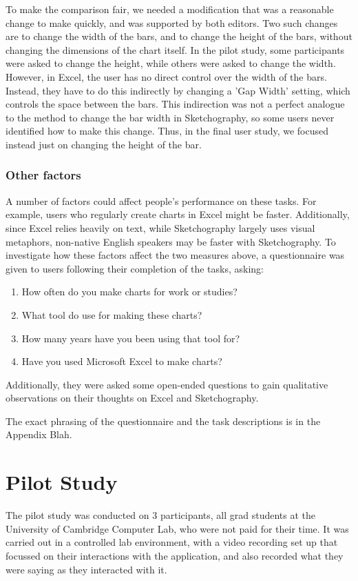 To make the comparison fair, we needed a modification that was a reasonable change to make quickly, and was supported by both editors. Two such changes are to change the width of the bars, and to change the height of the bars, without changing the dimensions of the chart itself. In the pilot study, some participants were asked to change the height, while others were asked to change the width. However, in Excel, the user has no direct control over the width of the bars. Instead, they have to do this indirectly by changing a 'Gap Width' setting, which controls the space between the bars. This indirection was not a perfect analogue to the method to change the bar width in Sketchography, so some users never identified how to make this change. Thus, in the final user study, we focused instead just on changing the height of the bar.

\subsubsection*{Other factors}
A number of factors could affect people's performance on these tasks. For example, users who regularly create charts in Excel might be faster. Additionally, since Excel relies heavily on text, while Sketchography largely uses visual metaphors, non-native English speakers may be faster with Sketchography. To investigate how these factors affect the two measures above, a questionnaire was given to users following their completion of the tasks, asking:

\begin{enumerate}
\item How often do you make charts for work or studies?
\item What tool do use for making these charts?
\item How many years have you been using that tool for?
\item Have you used Microsoft Excel to make charts?
\end{enumerate}

Additionally, they were asked some open-ended questions to gain qualitative observations on their thoughts on Excel and Sketchography.

The exact phrasing of the questionnaire and the task descriptions is in the Appendix Blah.


\section{Pilot Study}
The pilot study was conducted on 3 participants, all grad students at the University of Cambridge Computer Lab, who were not paid for their time. It was carried out in a controlled lab environment, with a video recording set up that focussed on their interactions with the application, and also recorded what they were saying as they interacted with it.

